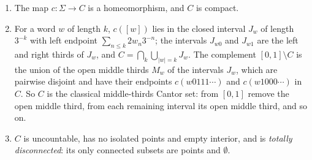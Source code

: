 \begin{proposition}\label{general-topology:proposition-cantor-set}
\begin{enumerate}
\item The map $c \colon \Sigma \to C$ is a homeomorphism, and $C$ is compact.
\item For a word $w$ of length $k$, $c([w])$ lies in the closed interval $J_w$ of length $3^{-k}$ with left endpoint $\sum_{n \leq k}2w_n3^{-n}$; the intervals $J_{w0}$ and $J_{w1}$ are the left and
right thirds of $J_w$, and $C = \bigcap_k\bigcup_{|w| = k}J_w$. The complement $[0, 1] \setminus C$ is the union of the open middle thirds $M_w$ of the intervals $J_w$, which are pairwise disjoint
and have their endpoints $c(w0111\cdots)$ and $c(w1000\cdots)$ in $C$. So $C$ is the classical middle-thirds Cantor set: from $[0, 1]$ remove the open middle third, from each remaining interval its open
middle third, and so on.
\item $C$ is uncountable, has no isolated points and empty interior, and is \emph{totally disconnected}: its only connected subsets are points and $\emptyset$.
\end{enumerate}
\end{proposition}

